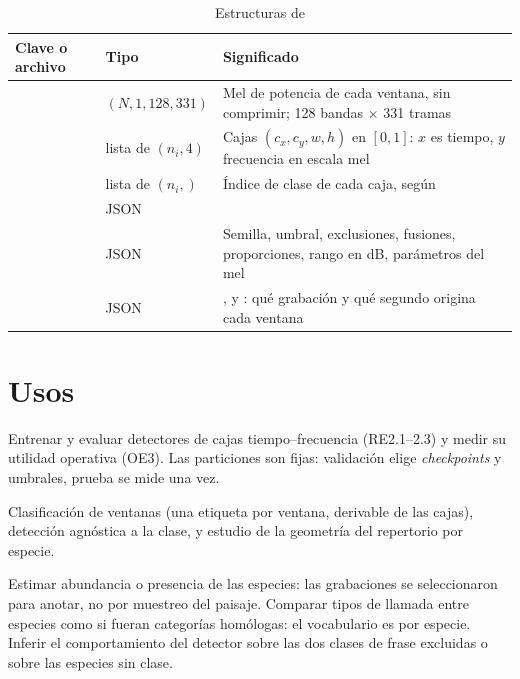 \documentclass[12pt,a4paper]{article}
\begin{document}
\begin{table}[htbp]
    \centering
    \caption{Estructuras de }
    \label{tab:processed}
    \small
    \begin{tabular}{@{}L{3.6cm}L{3.0cm}L{7.2cm}@{}}
        \toprule
        \textbf{Clave o archivo} & \textbf{Tipo} & \textbf{Significado} \\
        \midrule
         &  $(N, 1, 128, 331)$ & Mel de potencia de cada ventana, sin comprimir; 128 bandas $\times$ 331 tramas \\
         & lista de $(n_i, 4)$ & Cajas $(c_x, c_y, w, h)$ en $[0,1]$: $x$ es tiempo, $y$ frecuencia en escala mel \\
         & lista de $(n_i,)$  & Índice de clase de cada caja, según  \\
         & JSON &  \\
         & JSON & Semilla, umbral, exclusiones, fusiones, proporciones, rango en dB, parámetros del mel \\
         & JSON & ,  y : qué grabación y qué segundo origina cada ventana \\
        \bottomrule
    \end{tabular}
\end{table}

\section{Usos}

 Entrenar y evaluar detectores de cajas tiempo--frecuencia (RE2.1--2.3)
y medir su utilidad operativa (OE3). Las particiones son fijas: validación elige
\emph{checkpoints} y umbrales, prueba se mide una vez.

 Clasificación de ventanas (una etiqueta por ventana, derivable de las
cajas), detección agnóstica a la clase, y estudio de la geometría del repertorio por especie.

 Estimar abundancia o presencia de las especies: las grabaciones
se seleccionaron para anotar, no por muestreo del paisaje. Comparar tipos de llamada entre
especies como si fueran categorías homólogas: el vocabulario es por especie. Inferir el
comportamiento del detector sobre las dos clases de frase excluidas o sobre las especies sin
clase.
\end{document}
